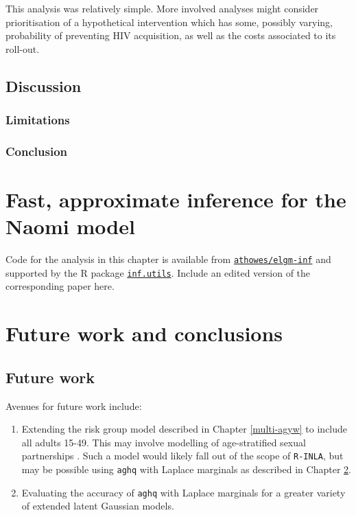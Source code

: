 \documentclass[a4paper, nobind]{templates/ociamthesis}
\providecommand{\tightlist}{%
  \setlength{\itemsep}{0pt}\setlength{\parskip}{0pt}}
\begin{document}
This analysis was relatively simple.
More involved analyses might consider prioritisation of a hypothetical intervention which has some, possibly varying, probability of preventing HIV acquisition, as well as the costs associated to its roll-out.

\hypertarget{discussion-1}{%
\section{Discussion}\label{discussion-1}}

\hypertarget{limitations-1}{%
\subsection{Limitations}\label{limitations-1}}

\hypertarget{conclusion-1}{%
\subsection{Conclusion}\label{conclusion-1}}

\hypertarget{elgm-inf}{%
\chapter{Fast, approximate inference for the Naomi model}\label{elgm-inf}}

\adjustmtc
{}

Code for the analysis in this chapter is available from \href{https://github.com/athowes/elgm-inf}{\texttt{athowes/elgm-inf}} and supported by the R package \href{https://athowes.github.io/inf.utils}{\texttt{inf.utils}}.
Include an edited version of the corresponding paper here.

\hypertarget{future-work-and-conclusions}{%
\chapter{Future work and conclusions}\label{future-work-and-conclusions}}

\adjustmtc
{}

\hypertarget{future-work}{%
\section{Future work}\label{future-work}}

Avenues for future work include:

\begin{enumerate}
\def\labelenumi{\arabic{enumi}.}
\tightlist
\item
  Extending the risk group model described in Chapter \ref{multi-agyw} to include all adults 15-49. This may involve modelling of age-stratified sexual partnerships \autocite{wolock2021evaluating}. Such a model would likely fall out of the scope of \texttt{R-INLA}, but may be possible using \texttt{aghq} with Laplace marginals as described in Chapter \ref{elgm-inf}.
\item
  Evaluating the accuracy of \texttt{aghq} with Laplace marginals for a greater variety of extended latent Gaussian models.
\end{enumerate}
\end{document}
